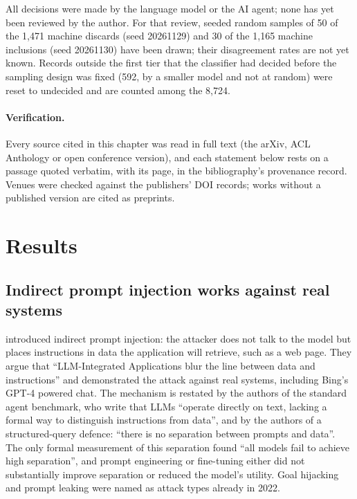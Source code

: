 All decisions were made by the language model or the AI agent; none has
yet been reviewed by the author. For that review, seeded random samples of
50 of the 1,471 machine discards (seed 20261129) and 30 of the 1,165
machine inclusions (seed 20261130) have been drawn; their disagreement
rates are not yet known. Records outside the first tier that the
classifier had decided before the sampling design was fixed (592, by a
smaller model and not at random) were reset to undecided and are counted
among the 8,724.

\paragraph{Verification.}
Every source cited in this chapter was read in full text (the arXiv,
ACL Anthology or open conference version), and each statement below
rests on a passage quoted verbatim, with its page, in the bibliography's
provenance record. Venues were checked against the publishers' DOI
records; works without a published version are cited as preprints.

\section{Results}
\label{prompt-injection:results}

\subsection{Indirect prompt injection works against real systems}

\textcite{Greshake2023Signed} introduced indirect prompt injection: the
attacker does not talk to the model but places instructions in data the
application will retrieve, such as a web page. They argue that
\enquote{LLM-Integrated Applications blur the line between data and
instructions} and demonstrated the attack against real systems,
including Bing's GPT-4 powered chat. The mechanism is restated by the
authors of the standard agent benchmark, who write that LLMs
\enquote{operate directly on text, lacking a formal way to distinguish
instructions from data}\autocite{Debenedetti2024AgentDojo}, and by the
authors of a structured-query defence: \enquote{there is no separation
between prompts and data}\autocite{Chen2025StruQ}. The only formal
measurement of this separation found \enquote{all models fail to achieve
high separation}, and prompt engineering or fine-tuning either did not
substantially improve separation or reduced the model's
utility\autocite{Zverev2025Separate}. Goal hijacking and prompt leaking
were named as attack types already in 2022\autocite{Perez2022Ignore}.

